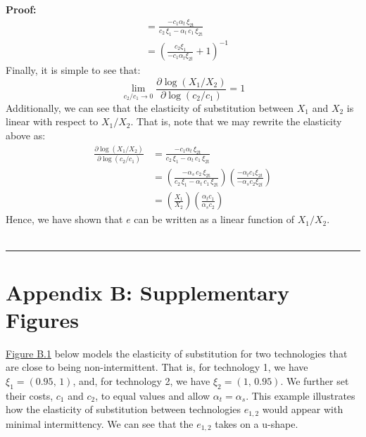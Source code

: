 \documentclass[11pt,a4paper]{extarticle}
\newenvironment{proof}[1][Proof]{\noindent\textbf{#1:} }{\ \rule{0.5em}{0.5em}}
\begin{document}
\begin{proof}
\begin{align*}
	&= \frac{-c_1 \alpha _{t}\,\xi _{\mathrm{2t}}}{c_2\,\xi_1-\alpha _{t}\,c_{1}\,\xi _{\mathrm{2t}}}\\
	&= \left( \frac{c_2 \xi_1 }{-c_1 \alpha_t \xi_{2t}} + 1 \right)^{-1}
	\end{align*}
	Finally, it is simple to see that:
	$$ \lim_{c_2/c_1 \to 0} \frac{\partial \log(X_1/X_2)}{\partial \log(c_2/c_1)} = 1$$
	Additionally, we can see that the elasticity of substitution between $X_1$ and $X_2$ is linear with respect to $X_1/X_2$. That is, note that we may rewrite the elasticity above as:
	\begin{align*}
	\frac{\partial \log(X_1/X_2)}{\partial \log(c_2/c_1)} &= \frac{-c_1 \alpha _{t}\,\xi _{\mathrm{2t}}}{c_2\,\xi_1-\alpha _{t}\,c_{1}\,\xi _{\mathrm{2t}}} \\
	&= \left( \frac{-\alpha _{s}\,c_{2}\,\xi _{\mathrm{2t}}}{c_2\,\xi_1-\alpha _{t}\,c_{1}\,\xi _{\mathrm{2t}}} \right) \left( \frac{- \alpha_t c_1 \xi_{2t} }{- \alpha_s c_2 \xi_{2t}} \right)\\
	&= \left( \frac{X_1}{X_2} \right) \left( \frac{ \alpha_t c_1  }{\alpha_s c_2 } \right)
	\end{align*}
	Hence, we have shown that $e$ can be written as a linear function of $X_1/X_2$. 
	\\ \hfill
\end{proof}


\pagebreak





\section{Appendix B: Supplementary Figures}
\label{sec:AppendixB}


\hyperref[fig:eosrange]{Figure B.1} below models the elasticity of substitution for two technologies that are close to being non-intermittent. That is, for technology 1, we have $\xi_1 = (0.95,\, 1)$, and, for technology 2, we have $\xi_2 = (1, \,0.95)$. We further set their costs, $c_1$ and $c_2$, to equal values and allow $\alpha_t = \alpha_s$. This example illustrates how the elasticity of substitution between technologies $e_{1,2}$ would appear with minimal intermittency. We can see that the $e_{1,2}$ takes on a u-shape. 
\end{document}
